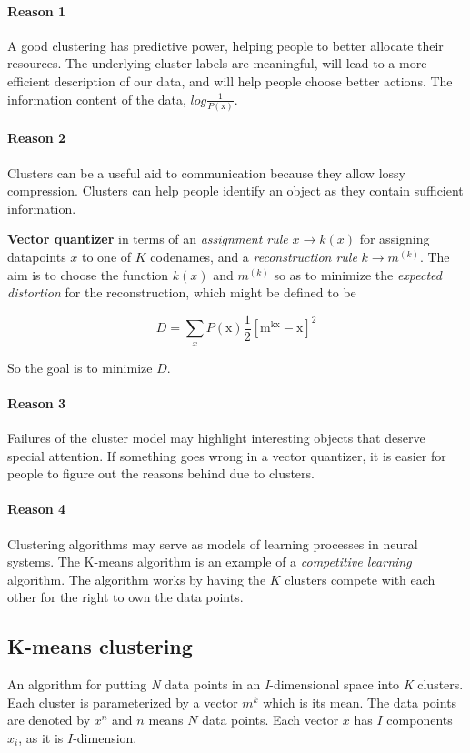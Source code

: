 \documentclass[11pt]{article}
\begin{document}
\paragraph{Reason 1}
  A good clustering has predictive power, helping people to better allocate their resources. The underlying cluster labels are meaningful, will lead to a more efficient description of our data, and will help people choose better actions. The information content of the data, $log\frac{1}{P({\mathrm{x}})}$.
\paragraph{Reason 2} Clusters can be a useful aid to communication because they allow lossy compression. Clusters can help people identify an object as they contain sufficient information.

\textbf{Vector quantizer} in terms of an \textit{assignment rule} $x \rightarrow k(x)$ for assigning datapoints $x$ to one of $K$ codenames, and a \textit{reconstruction rule} $k \rightarrow m^{(k)}$. The aim is to choose the function $k(x)$ and $m^(k)$ so as to minimize the \textit{expected distortion} for the reconstruction, which might be defined to be

\begin{equation}
D = \sum_x P(\mathrm{x})\frac{1}{2}[\mathrm{m^{kx}}-\mathrm{x}]^2  
\end{equation}

So the goal is to minimize $D$.

\paragraph{Reason 3}
  Failures of the cluster model may highlight interesting objects that deserve special attention. If something goes wrong in a vector quantizer, it is easier for people to figure out the reasons behind due to clusters.
\paragraph{Reason 4}
  Clustering algorithms may serve as models of learning processes in neural systems. The K-means algorithm is an example of a \textit{competitive learning} algorithm. The algorithm works by having the $K$ clusters compete with each other for the right to own the data points.

\subsection{K-means clustering}
An algorithm for putting \textit{N} data points in an \textit{I}-dimensional space into \textit{K} clusters. Each cluster is parameterized by a vector $m^k$ which is its mean. The data points are denoted by {$x^n$} and $n$ means $N$ data points. Each vector $x$ has $I$ components $x_i$, as it is $I$-dimension.
\end{document}
